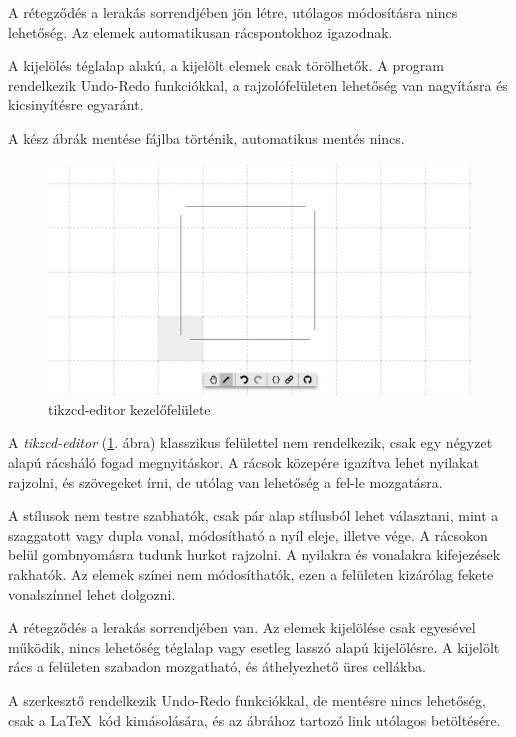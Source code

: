 A rétegződés a lerakás sorrendjében jön létre, utólagos módosításra nincs lehetőség. Az elemek automatikusan rácspontokhoz igazodnak. 

A kijelölés téglalap alakú, a kijelölt elemek csak törölhetők. A program rendelkezik Undo-Redo funkciókkal, a rajzolófelületen lehetőség van nagyításra és kicsinyítésre egyaránt. 

A kész ábrák mentése fájlba történik, automatikus mentés nincs.


\begin{figure}[!h]
	\includegraphics[width=\textwidth]{images/tikzcd.png}
	\caption{tikzcd-editor kezelőfelülete \cite{tikzcd}}
	\label{fig:tikzcd}
\end{figure}

A \textit{tikzcd-editor} (\ref{fig:tikzcd}. ábra) klasszikus felülettel nem rendelkezik, csak egy négyzet alapú rácsháló fogad megnyitáskor. A rácsok közepére igazítva lehet nyilakat rajzolni, és szövegeket írni, de utólag van lehetőség a fel-le mozgatásra. 

A stílusok nem testre szabhatók, csak pár alap stílusból lehet választani, mint a szaggatott vagy dupla vonal, módosítható a nyíl eleje, illetve vége. A rácsokon belül gombnyomásra tudunk hurkot rajzolni. A nyilakra és vonalakra kifejezések rakhatók. Az elemek színei nem módosíthatók, ezen a felületen kizárólag fekete vonalszínnel lehet dolgozni.

A rétegződés a lerakás sorrendjében van. Az elemek kijelölése csak egyesével működik, nincs lehetőség téglalap vagy esetleg lasszó alapú kijelölésre. A kijelölt rács a felületen szabadon mozgatható, és áthelyezhető üres cellákba.

A szerkesztő rendelkezik Undo-Redo funkciókkal, de mentésre nincs lehetőség, csak a \LaTeX\ kód kimásolására, és az ábrához tartozó link utólagos betöltésére.

